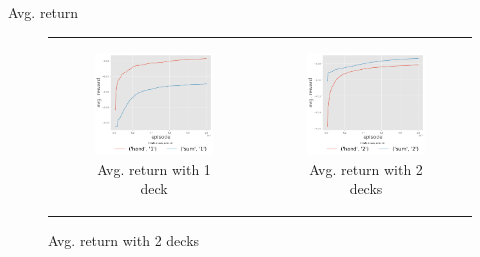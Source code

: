 \begin{frame}{Avg. return}

\begin{figure}
\begin{tabular}{cc}
\centering
 \begin{subfigure}[b]{0.48\textwidth}
  	 \includegraphics[width=\textwidth]{../report/figures/avgReturnEp_ndeck1.png}
   \caption{Avg. return with 1 deck}
 \end{subfigure}
 &
 \begin{subfigure}[b]{0.48\textwidth}
  	 \includegraphics[width=\textwidth]{../report/figures/avgReturnEp_ndeck2.png}
   \caption{Avg. return with 2 decks}
 \end{subfigure}
\end{tabular}
\end{figure}

\end{frame}

